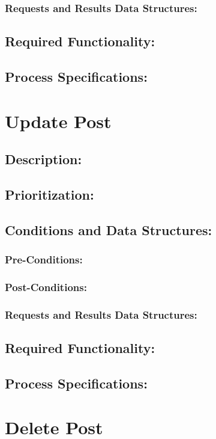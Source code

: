 \documentclass[a4paper,11pt]{article}
\begin{document}
\subsubsection*{Requests and Results Data Structures:}
\subsection{Required Functionality:} 
\subsection{Process Specifications:} 

\section{Update Post}
\subsection*{Description:}
\subsection{Prioritization:} 
\subsection{Conditions and Data Structures:}
\subsubsection*{Pre-Conditions:}
\subsubsection*{Post-Conditions:}
\subsubsection*{Requests and Results Data Structures:}
\subsection{Required Functionality:} 
\subsection{Process Specifications:} 

\section{Delete Post}
\end{document}
